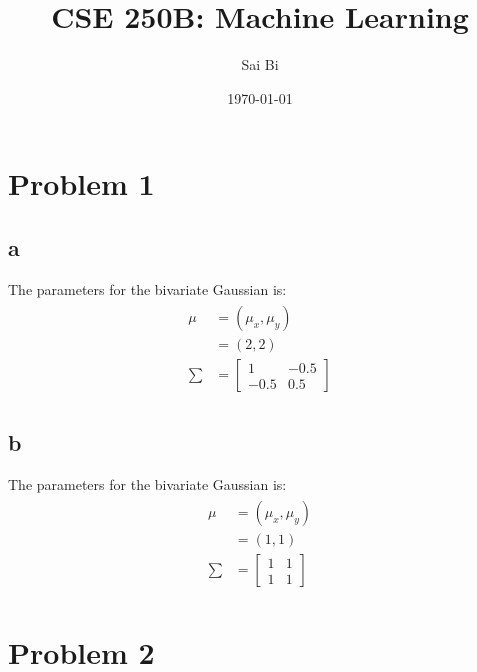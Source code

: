 \documentclass[a4paper,11pt]{article}
\theoremstyle{mytheor}
\begin{document}
\title{CSE 250B: Machine Learning}

\author{Sai Bi}

\date{\today}

\maketitle

\section*{Problem 1}
\subsection*{a}
The parameters for the bivariate Gaussian is:
\begin{align}
	\begin{split}
	\mu &= (\mu_x, \mu_y) \\
	    &= (2, 2)  \\
	\sum &= \begin{bmatrix}
				1  & -0.5 \\
				-0.5 & 0.5 
			\end{bmatrix}
	\end{split}
\end{align}

\subsection*{b}
The parameters for the bivariate Gaussian is:
\begin{align}
\begin{split}
\mu &= (\mu_x, \mu_y) \\
&= (1, 1)  \\
\sum &= \begin{bmatrix}
1  & 1 \\
1 & 1 
\end{bmatrix}
\end{split}
\end{align}

\section*{Problem 2}
\end{document}
